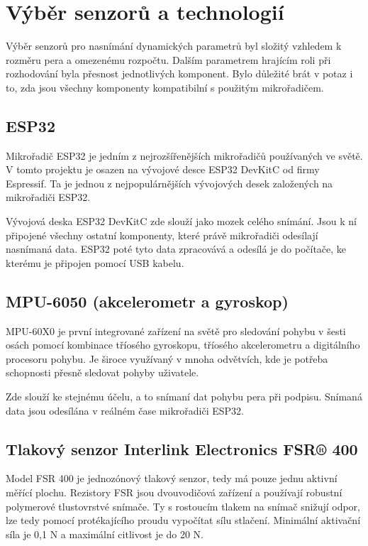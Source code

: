 \section{Výběr senzorů a technologií}
Výběr senzorů pro nasnímání dynamických parametrů byl složitý vzhledem k rozměru pera a omezenému rozpočtu. %
Dalším parametrem hrajícím roli při rozhodování byla přesnost jednotlivých komponent.                       %
Bylo důležité brát v potaz i to, zda jsou všechny komponenty kompatibilní s použitým mikrořadičem.          %

\subsection*{ESP32}
Mikrořadič ESP32 je jedním z nejrozšířenějších mikrořadičů používaných ve světě.                            %
V tomto projektu je osazen na vývojové desce ESP32 DevKitC od firmy Espressif.                              %
Ta je jednou z nejpopulárnějších vývojových desek založených na mikrořadiči ESP32.~\cite{Kolban2017}        %

Vývojová deska ESP32 DevKitC zde slouží jako mozek celého snímání.                                          %
Jsou k ní připojené všechny ostatní komponenty, které právě mikrořadiči odesílají nasnímaná data.           %
ESP32 poté tyto data zpracovává a odesílá je do počítače, ke kterému je připojen  pomocí USB kabelu.        %

\subsection*{MPU-6050 (akcelerometr a gyroskop)}
MPU-60X0 je první integrované zařízení na světě pro sledování pohybu v šesti osách pomocí           %
kombinace tříosého gyroskopu, tříosého akcelerometru a digitálního procesoru pohybu.                %
Je široce využívaný v mnoha odvětvích, kde je potřeba schopnosti přesně sledovat pohyby uživatele.~\cite{InvenSense2015}%

Zde slouží ke stejnému účelu, a to snímaní dat pohybu pera při podpisu.                             %
Snímaná data jsou odesílána v reálném čase mikrořadiči ESP32.                                       %

\subsection*{Tlakový senzor Interlink Electronics FSR® 400}
Model FSR 400 je jednozónový tlakový senzor, tedy má pouze jednu aktivní měřící plochu.                       %
Rezistory FSR jsou dvouvodičová zařízení a používají robustní polymerové tlustovrstvé snímače.                %
Ty s rostoucím tlakem na snímač snižují odpor, lze tedy pomocí protékajícího proudu vypočítat sílu stlačení.  %
Minimální aktivační síla je 0,1 N a maximální citlivost je do 20 N.~\cite{InterlinkElectronicsFSR400}         %


